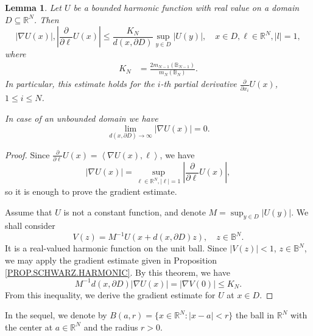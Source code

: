 \documentclass[10pt]{amsart}
\newtheorem{lemma}[theorem]{Lemma}
\theoremstyle{definition}
\numberwithin{equation}{section}
\begin{document}
\begin{lemma}\label{LE.GRADIENT.DISTANCE}
Let $U$  be a bounded harmonic function with real value     on a domain $D\subseteq \mathbb{R}^N$. Then
\begin{equation*}
|\nabla U (x) |, \left|\frac {\partial}{\partial \ell}U(x)\right| 
\le  \frac{K_ N} {d(x,\partial D)} \sup_{y\in D} |U(y)|,\quad x\in D,\ell\in\mathbb{R}^N, |l|=1,
\end{equation*}
where
\begin{equation*}\begin{split}
K_ N & = \frac {2m_{N-1} (\mathbb{B}_{N-1})} {m_N (\mathbb{B} _{N})}.
\end{split}\end{equation*}
In particular,   this estimate holds for the $i$-th partial derivative             $\frac {\partial}{\partial x_i}U(x)$,
$1\le  i\le N$.

In case of an unbounded  domain  we have
\begin{equation*}
\lim _{d(x, \partial D) \to  \infty}  |\nabla U (x) | = 0.
\end{equation*}
\end{lemma}

\begin{proof}
Since $\frac{\partial}{\partial \ell}U(x)  =  \left<\nabla U(x),\ell\right>$, we have
\begin{equation*}
\left|\nabla U(x)\right| =    \sup_{ \ell\in \mathbb{R}^N, |\ell|=1}  \left| \frac{\partial}{\partial \ell}U(x) \right|,
\end{equation*}
so   it is enough to  prove   the gradient  estimate.

Assume that $U$ is not a  constant  function, and denote  $M  =  \sup_{y\in D}  |U(y)|$.              We shall  consider
\begin{equation*}
V (z) = M^{-1}  U (x  +  d(x,\partial D)  z),\quad   z\in \mathbb{B}^N.
\end{equation*}
It  is  a  real-valued  harmonic function  on  the  unit  ball. Since  $|V (z)|<1$,  $z\in \mathbb{B}^N$,  we may  apply
the gradient  estimate  given in  Proposition \ref{PROP.SCHWARZ.HARMONIC}.  By this theorem,  we have
\begin{equation*}
 M ^{-1}  d(x,\partial D)   |\nabla U(x)| = |\nabla V (0)|\le K_N.
\end{equation*}
From this inequality, we derive the gradient  estimate for  $U$  at  $x\in D$.
\end{proof}

In the sequel,       we denote by $B(a,r) = \{x\in\mathbb{R}^N:|x-a|<r\}$ the ball in $\mathbb {R}^N$ with the center at
$a\in \mathbb{R}^N$ and the radius $r>0$.
\end{document}
